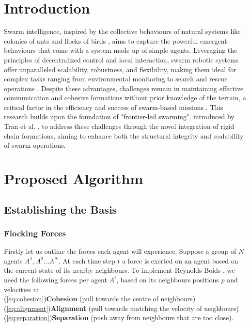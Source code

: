 \documentclass[runningheads]{llncs}
\begin{document}
\section{Introduction}
Swarm intelligence, inspired by the collective behaviours of natural systems like colonies of ants and flocks of birds \cite{garnier2007}, aims to capture the powerful emergent behaviours that come with a system made up of simple agents\cite{mataric1995}.
Leveraging the principles of decentralized control and local interaction, swarm robotic systems offer unparalleled scalability, robustness, and flexibility, making them ideal for complex tasks ranging from environmental monitoring to search and rescue operations \cite{hamann2018,ijspeert2001}. 
Despite these advantages, challenges remain in maintaining effective communication and cohesive formations without prior knowledge of the terrain, a critical factor in the efficiency and success of swarm-based missions \cite{xu2014}. 
This research builds upon the foundation of "frontier-led swarming", introduced by Tran et al. \cite{tran2022}, to address these challenges through the novel integration of rigid chain formations, aiming to enhance both the structural integrity and scalability of swarm operations.






\section{Proposed Algorithm}
\subsection{Establishing the Basis}
\subsubsection{Flocking Forces}
Firstly let us outline the forces each agent will experience. Suppose a group of $N$ agents $A^1, A^2...A^N$. At each time step $t$ a force is exerted on an agent based on the current state of its nearby neighbours. To implement Reynolds Boids \cite{reynolds1987}, we need the following forces per agent $A^i$, based on its neighbours positions $p$ and velocities $v$:\\
\indent(\ref{eq:cohesion})\nobreakspace\textbf{Cohesion} 
    (pull towards the centre of neighbours) \\
\indent(\ref{eq:alignment})\nobreakspace\textbf{Alignment} 
    (pull towards matching the velocity of neighbours)\\
\indent(\ref{eq:separation})\nobreakspace\textbf{Separation} 
    (push away from neighbours that are too close).
\end{document}
